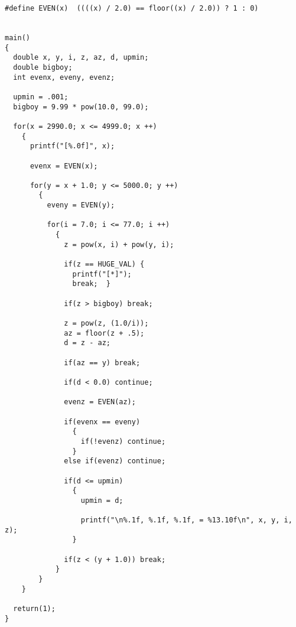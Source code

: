 \begin{appendix}
\begin{lstlisting}[caption={Fermat Near-Miss Finder (Version 2)}, captionpos=b]
#define EVEN(x)  ((((x) / 2.0) == floor((x) / 2.0)) ? 1 : 0)


main()
{
  double x, y, i, z, az, d, upmin;
  double bigboy;
  int evenx, eveny, evenz;
  
  upmin = .001;
  bigboy = 9.99 * pow(10.0, 99.0);

  for(x = 2990.0; x <= 4999.0; x ++)
    {
      printf("[%.0f]", x);

      evenx = EVEN(x);
      
      for(y = x + 1.0; y <= 5000.0; y ++)
        {
          eveny = EVEN(y);

          for(i = 7.0; i <= 77.0; i ++)
            {
              z = pow(x, i) + pow(y, i);

              if(z == HUGE_VAL) {
                printf("[*]");
                break;  }

              if(z > bigboy) break;

              z = pow(z, (1.0/i));
              az = floor(z + .5);
              d = z - az;

              if(az == y) break;

              if(d < 0.0) continue;

              evenz = EVEN(az);

              if(evenx == eveny)
                {
                  if(!evenz) continue;
                }
              else if(evenz) continue;

              if(d <= upmin)
                {
                  upmin = d;
                  
                  printf("\n%.1f, %.1f, %.1f, = %13.10f\n", x, y, i, z);
                }
              
              if(z < (y + 1.0)) break;
            }
        }
    }
  
  return(1);
}
\end{lstlisting}

\end{appendix}